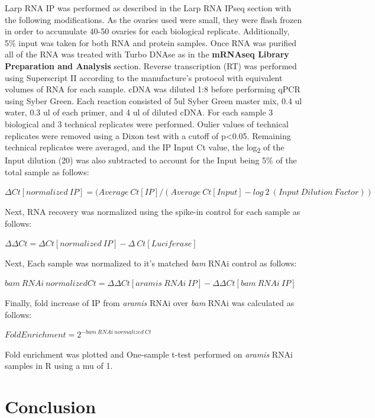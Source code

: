 \documentclass[12pt,oneside]{reedthesis}
\begin{document}
Larp RNA IP was performed as described in the Larp RNA IPseq section with the following modifications. As the ovaries used were small, they were flash frozen in order to accumulate 40-50 ovaries for each biological replicate. Additionally, 5\% input was taken for both RNA and protein samples. Once RNA was purified all of the RNA was treated with Turbo DNAse as in the \textbf{mRNAseq Library Preparation and Analysis} section. Reverse transcription (RT) was performed using Superscript II according to the manufacture's protocol with equivalent volumes of RNA for each sample. cDNA was diluted 1:8 before performing qPCR using Syber Green. Each reaction consisted of 5ul Syber Green master mix, 0.4 ul water, 0.3 ul of each primer, and 4 ul of diluted cDNA. For each sample 3 biological and 3 technical replicates were performed. Oulier values of technical replicates were removed using a Dixon test with a cutoff of p\textless0.05. Remaining technical replicates were averaged, and the IP Input Ct value, the log\textsubscript{2} of the Input dilution (20) was also subtracted to account for the Input being 5\% of the total sample as follows:

\(\Delta Ct[normalized\ IP] = (Average\ Ct[IP]/(Average\ Ct[Input] - log~2~(Input\ Dilution\ Factor))\)

Next, RNA recovery was normalized using the spike-in control for each sample as follows:

\(\Delta \Delta Ct = \Delta Ct[normalized\ IP]-\Delta\ Ct[Luciferase]\)

Next, Each sample was normalized to it's matched \emph{bam} RNAi control as follows:

\(bam\ RNAi\ normalized Ct= \Delta \Delta Ct[aramis\ RNAi\ IP] - \Delta \Delta Ct[bam\ RNAi\ IP]\)

Finally, fold increase of IP from \emph{aramis} RNAi over \emph{bam} RNAi was calculated as follows:

\(Fold Enrichment = 2^{-bam\ RNAi\ normalized\ Ct}\)

Fold enrichment was plotted and One-sample t-test performed on \emph{aramis} RNAi samples in R using a mu of 1.


\hypertarget{conclusion}{%
\chapter{Conclusion}\label{conclusion}}
\end{document}

